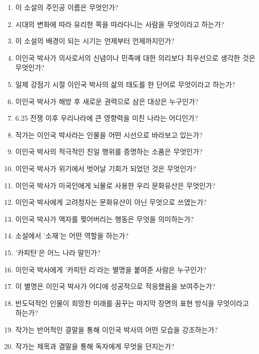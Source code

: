 \documentclass[fs9,seriesRus]{korfarm-base}
\begin{document}
\kfActivityBg {}
\par{}\par\nopagebreak[4]\smallskip\nopagebreak[4]
\kfBeginMC
\begin{enumerate}[leftmargin=22pt, itemsep=6pt, topsep=4pt, label=\textbf{\arabic*.}]
\item 이 소설의 주인공 이름은 무엇인가?
\item 시대의 변화에 따라 유리한 쪽을 따라다니는 사람을 무엇이라고 하는가?
\item 이 소설의 배경이 되는 시기는 언제부터 언제까지인가?
\item 이인국 박사가 의사로서의 신념이나 민족에 대한 의리보다 최우선으로 생각한 것은 무엇인가?
\item 일제 강점기 시절 이인국 박사의 삶의 태도를 한 단어로 무엇이라고 하는가?
\item 이인국 박사가 해방 후 새로운 권력으로 삼은 대상은 누구인가?
\item 6.25 전쟁 이후 우리나라에 큰 영향력을 미친 나라는 어디인가?
\item 작가는 이인국 박사라는 인물을 어떤 시선으로 바라보고 있는가?
\item 이인국 박사의 적극적인 친일 행위를 증명하는 소품은 무엇인가?
\item 이인국 박사가 위기에서 벗어날 기회가 되었던 것은 무엇인가?
\item 이인국 박사가 미국인에게 뇌물로 사용한 우리 문화유산은 무엇인가?
\item 이인국 박사에게 고려청자는 문화유산이 아닌 무엇으로 쓰였는가?
\item 이인국 박사가 액자를 찢어버리는 행동은 무엇을 의미하는가?
\item 소설에서 '소재'는 어떤 역할을 하는가?
\item '카피탄'은 어느 나라 말인가?
\item 이인국 박사에게 '카피탄 리'라는 별명을 붙여준 사람은 누구인가?
\item 이 별명은 이인국 박사가 어디에 성공적으로 적응했음을 보여주는가?
\item 반도덕적인 인물이 희망찬 미래를 꿈꾸는 마지막 장면의 표현 방식을 무엇이라고 하는가?
\item 작가는 반어적인 결말을 통해 이인국 박사의 어떤 모습을 강조하는가?
\item 작가는 제목과 결말을 통해 독자에게 무엇을 던지는가?
\end{enumerate}
\kfEndMC
\end{document}
